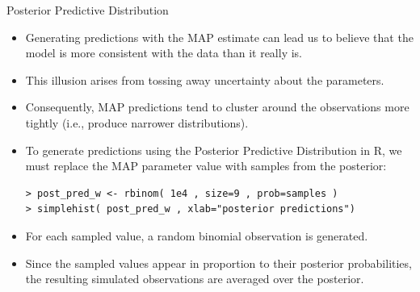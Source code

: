\documentclass[handout]{beamer}
\begin{document}
\begin{frame}[fragile]{Posterior Predictive Distribution}
\scriptsize{

\begin{itemize}

\item Generating predictions with the MAP estimate can lead us to believe that the model is more consistent with the data than it really is.

\item This illusion arises from tossing away uncertainty about the parameters. 

\item Consequently, MAP predictions tend to cluster around the observations more tightly (i.e., produce narrower distributions). 

\item  To generate predictions using the Posterior Predictive Distribution in R, we must replace the MAP parameter value with samples from the posterior:

\begin{verbatim}
> post_pred_w <- rbinom( 1e4 , size=9 , prob=samples )
> simplehist( post_pred_w , xlab="posterior predictions")
\end{verbatim}


\item For each sampled value, a random binomial observation is generated.

\item Since the sampled values appear in proportion to their posterior probabilities, the resulting simulated observations are averaged over the posterior.


\end{itemize}


} 
\end{frame}
\end{document}
